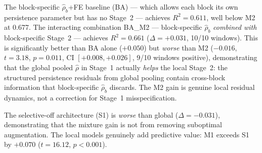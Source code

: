\documentclass[11pt,a4paper]{article}
\begin{document}
The block-specific $\hat\rho_b$+FE baseline (BA) --- which allows each block its own persistence parameter but has no Stage~2 --- achieves $R^2 = 0.611$, well below M2 at 0.677. The interacting combination BA\_M2 --- block-specific $\hat\rho_b$ \emph{combined with} block-specific Stage~2 --- achieves $R^2 = 0.661$ ($\Delta = +0.031$, 10/10 windows). This is significantly better than BA alone ($+0.050$) but \emph{worse} than M2 ($-0.016$, $t = 3.18$, $p = 0.011$, CI $[+0.008, +0.026]$, 9/10 windows positive), demonstrating that the global pooled $\hat\rho$ in Stage~1 actually \emph{helps} the local Stage~2: the structured persistence residuals from global pooling contain cross-block information that block-specific $\hat\rho_b$ discards. The M2 gain is genuine local residual dynamics, not a correction for Stage~1 misspecification.

The selective-off architecture (S1) is \emph{worse} than global ($\Delta = -0.031$), demonstrating that the mixture gain is not from removing suboptimal augmentation. The local models genuinely add predictive value: M1 exceeds S1 by $+0.070$ ($t = 16.12$, $p < 0.001$).
\end{document}
